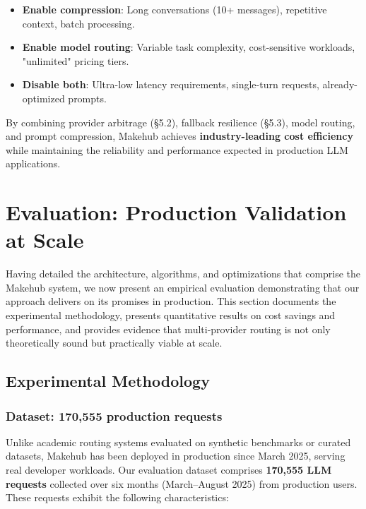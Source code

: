 \documentclass[english]{article}
\begin{document}
\begin{itemize}
    \item \textbf{Enable compression}: Long conversations (10+ messages), repetitive context, batch processing.
    \item \textbf{Enable model routing}: Variable task complexity, cost-sensitive workloads, "unlimited" pricing tiers.
    \item \textbf{Disable both}: Ultra-low latency requirements, single-turn requests, already-optimized prompts.
\end{itemize}

By combining provider arbitrage (§5.2), fallback resilience (§5.3), model routing, and prompt compression, Makehub achieves \textbf{industry-leading cost efficiency} while maintaining the reliability and performance expected in production LLM applications.


\newpage
\section{Evaluation: Production Validation at Scale}

Having detailed the architecture, algorithms, and optimizations that comprise the Makehub system, we now present an empirical evaluation demonstrating that our approach delivers on its promises in production. This section documents the experimental methodology, presents quantitative results on cost savings and performance, and provides evidence that multi-provider routing is not only theoretically sound but practically viable at scale.

\subsection{Experimental Methodology}

\subsubsection{Dataset: 170,555 production requests}

Unlike academic routing systems evaluated on synthetic benchmarks or curated datasets, Makehub has been deployed in production since March 2025, serving real developer workloads. Our evaluation dataset comprises \textbf{170,555 LLM requests} collected over six months (March--August 2025) from production users. These requests exhibit the following characteristics:

\medskip
\end{document}
